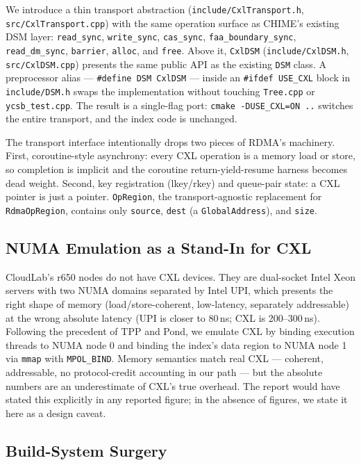 \documentclass[11pt,a4paper]{article}
\begin{document}
We introduce a thin transport abstraction (\texttt{include/CxlTransport.h}, \texttt{src/CxlTransport.cpp}) with the same operation surface as CHIME's existing DSM layer: \texttt{read\_sync}, \texttt{write\_sync}, \texttt{cas\_sync}, \texttt{faa\_boundary\_sync}, \texttt{read\_dm\_sync}, \texttt{barrier}, \texttt{alloc}, and \texttt{free}. Above it, \texttt{CxlDSM} (\texttt{include/CxlDSM.h}, \texttt{src/CxlDSM.cpp}) presents the same public API as the existing \texttt{DSM} class. A preprocessor alias --- \texttt{\#define DSM CxlDSM} --- inside an \texttt{\#ifdef USE\_CXL} block in \texttt{include/DSM.h} swaps the implementation without touching \texttt{Tree.cpp} or \texttt{ycsb\_test.cpp}. The result is a single-flag port: \texttt{cmake -DUSE\_CXL=ON ..} switches the entire transport, and the index code is unchanged.

The transport interface intentionally drops two pieces of RDMA's machinery. First, coroutine-style asynchrony: every CXL operation is a memory load or store, so completion is implicit and the coroutine return-yield-resume harness becomes dead weight. Second, key registration (lkey/rkey) and queue-pair state: a CXL pointer is just a pointer. \texttt{OpRegion}, the transport-agnostic replacement for \texttt{RdmaOpRegion}, contains only \texttt{source}, \texttt{dest} (a \texttt{GlobalAddress}), and \texttt{size}.

\subsection{NUMA Emulation as a Stand-In for CXL}

CloudLab's r650 nodes do not have CXL devices. They are dual-socket Intel Xeon servers with two NUMA domains separated by Intel UPI, which presents the right shape of memory (load/store-coherent, low-latency, separately addressable) at the wrong absolute latency (UPI is closer to 80\,ns; CXL is 200--300\,ns). Following the precedent of TPP and Pond, we emulate CXL by binding execution threads to NUMA node 0 and binding the index's data region to NUMA node 1 via \texttt{mmap} with \texttt{MPOL\_BIND}. Memory semantics match real CXL --- coherent, addressable, no protocol-credit accounting in our path --- but the absolute numbers are an underestimate of CXL's true overhead. The report would have stated this explicitly in any reported figure; in the absence of figures, we state it here as a design caveat.

\subsection{Build-System Surgery}
\end{document}

